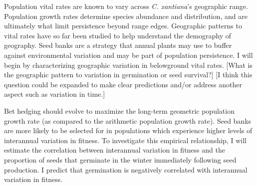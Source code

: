\documentclass[12pt, oneside, titlepage]{article}   	%
\begin{document}
Population vital rates are known to vary across \textit{C. xantiana}'s geographic range. Population growth rates determine species abundance and distribution, and are ultimately what limit persistence beyond range edges. Geographic patterns to vital rates have so far been studied to help understand the demography of geography. Seed banks are a strategy that annual plants may use to buffer against environmental variation and may be part of population persistence. I will begin by characterizing geographic variation in belowground vital rates. [What is the geographic pattern to variation in germination or seed survival?] [I think this question could be expanded to make clear predictions and/or address another aspect such as variation in time.]

Bet hedging should evolve to maximize the long-term geometric population growth rate (as compared to the arithmetic population growth rate). Seed banks are more likely to be selected for in populations which experience higher levels of interannual variation in fitness. To investigate this empirical relationship, I will estimate the correlation between interannual variation in fitness and the proportion of seeds that germinate in the winter immediately following seed production. I predict that germination is negatively correlated with interannual variation in fitness. %

\end{document}
